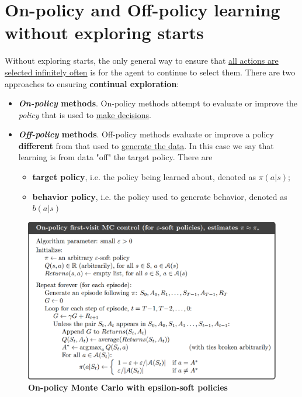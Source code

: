 \documentclass[11pt]{article}
\begin{document}
\section{On-policy and Off-policy learning without exploring starts}
Without exploring starts, the only general way to ensure that \underline{all actions are selected infinitely often} is for the agent to continue to select them. There are two approaches to ensuring \textbf{continual exploration}:
\begin{itemize}
\item \textbf{\emph{On-policy} methods}. On-policy methods attempt to evaluate or improve the \emph{policy} that is used to \underline{make decisions}.

\item \textbf{\emph{Off-policy} methods}. Off-policy methods evaluate or improve a policy \textbf{different} from that used to \underline{generate the data}. In this case we say that learning is from data "off" the target policy. There are 
\begin{itemize}
\item \textbf{target policy}, i.e.  the policy being learned about, denoted as $\pi(a|s)$; 
\item \textbf{behavior policy}, i.e. the policy used to generate behavior, denoted as $b(a|s)$
\end{itemize}  
\end{itemize}

\begin{figure}
\begin{minipage}[t]{1\linewidth}
  \centering
  \centerline{\includegraphics[scale = 0.3]{on_policy_mc_eps_soft.png}}
\end{minipage}
\caption{\footnotesize{\textbf{On-policy Monte Carlo with epsilon-soft policies}}}
\label{fig: on_policy_mc_eps_soft}
\end{figure}
\end{document}
